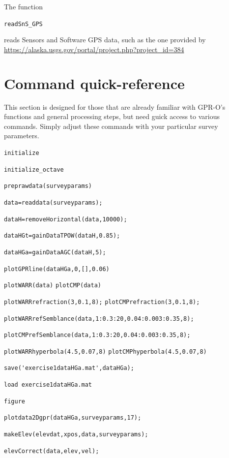 \documentclass[11pt]{article}
\begin{document}
The function

\qquad \verb#readSnS_GPS# 

reads Sensors and Software GPS data, such as the one provided by 
\url{https://alaska.usgs.gov/portal/project.php?project_id=384} 

\section{Command quick-reference}

This section is designed for those that are already familiar with GPR-O's
functions and general processing steps, but need guick access to
various commands. Simply adjust these commands with your particular
survey parameters.

\qquad \verb#initialize#
	
\qquad \verb#initialize_octave#

\qquad \verb#preprawdata(surveyparams)#

\qquad \verb#data=readdata(surveyparams);#

\qquad \verb#dataH=removeHorizontal(data,10000);#

\qquad \verb#dataHGt=gainDataTPOW(dataH,0.85);#

\qquad \verb#dataHGa=gainDataAGC(dataH,5);#

\qquad \verb#plotGPRline(dataHGa,0,[],0.06)#

\qquad \verb#plotWARR(data)#						\qquad \verb#plotCMP(data)#

\qquad \verb#plotWARRrefraction(3,0.1,8);#			\qquad \verb#plotCMPrefraction(3,0.1,8);#

\qquad \verb#plotWARRrefSemblance(data,1:0.3:20,0.04:0.003:0.35,8);#

\qquad \verb#plotCMPrefSemblance(data,1:0.3:20,0.04:0.003:0.35,8);#

\qquad \verb#plotWARRhyperbola(4.5,0.07,8)#			\qquad \verb#plotCMPhyperbola(4.5,0.07,8)#

\qquad \verb#save('exercise1dataHGa.mat',dataHGa);#

\qquad \verb#load exercise1dataHGa.mat#

\qquad \verb#figure#

\qquad \verb#plotdata2Dgpr(dataHGa,surveyparams,17);#

\qquad \verb#makeElev(elevdat,xpos,data,surveyparams);#

\qquad \verb#elevCorrect(data,elev,vel);#
\end{document}

